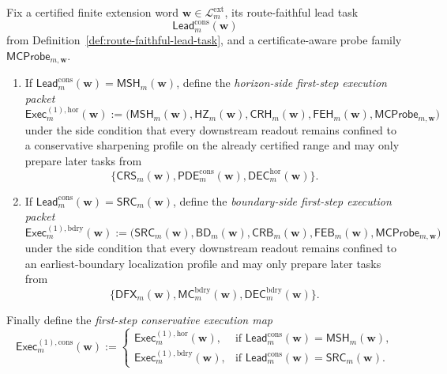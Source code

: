 \begin{definition}
\label{def:first-step-conservative-execution-packet}
Fix a certified finite extension word \(\mathbf w\in\mathcal L^{\mathrm{ext}}_{m}\), its route-faithful lead task
\[
  \mathsf{Lead}^{\mathrm{cons}}_{m}(\mathbf w)
\]
from Definition~\ref{def:route-faithful-lead-task}, and a certificate-aware probe family \(\mathsf{MCProbe}_{m,\mathbf w}\).
\begin{enumerate}[label=(\roman*)]
  \item If \(\mathsf{Lead}^{\mathrm{cons}}_{m}(\mathbf w)=\mathsf{MSH}_{m}(\mathbf w)\), define the \emph{horizon-side first-step execution packet}
  \[
    \mathsf{Exec}^{(1),\mathrm{hor}}_{m}(\mathbf w)
    :=
    \bigl(\mathsf{MSH}_{m}(\mathbf w),\mathsf{HZ}_{m}(\mathbf w),\mathsf{CRH}_{m}(\mathbf w),\mathsf{FEH}_{m}(\mathbf w),\mathsf{MCProbe}_{m,\mathbf w}\bigr)
  \]
  under the side condition that every downstream readout remains confined to a conservative sharpening profile on the already certified range and may only prepare later tasks from
  \[
    \{\mathsf{CRS}_{m}(\mathbf w),\mathsf{PDE}^{\mathrm{cons}}_{m}(\mathbf w),\mathsf{DEC}^{\mathrm{hor}}_{m}(\mathbf w)\}.
  \]
  \item If \(\mathsf{Lead}^{\mathrm{cons}}_{m}(\mathbf w)=\mathsf{SRC}_{m}(\mathbf w)\), define the \emph{boundary-side first-step execution packet}
  \[
    \mathsf{Exec}^{(1),\mathrm{bdry}}_{m}(\mathbf w)
    :=
    \bigl(\mathsf{SRC}_{m}(\mathbf w),\mathsf{BD}_{m}(\mathbf w),\mathsf{CRB}_{m}(\mathbf w),\mathsf{FEB}_{m}(\mathbf w),\mathsf{MCProbe}_{m,\mathbf w}\bigr)
  \]
  under the side condition that every downstream readout remains confined to an earliest-boundary localization profile and may only prepare later tasks from
  \[
    \{\mathsf{DFX}_{m}(\mathbf w),\mathsf{MC}^{\mathrm{bdry}}_{m}(\mathbf w),\mathsf{DEC}^{\mathrm{bdry}}_{m}(\mathbf w)\}.
  \]
\end{enumerate}
Finally define the \emph{first-step conservative execution map}
\[
  \mathsf{Exec}^{(1),\mathrm{cons}}_{m}(\mathbf w)
  :=
  \begin{cases}
    \mathsf{Exec}^{(1),\mathrm{hor}}_{m}(\mathbf w), & \text{if }\mathsf{Lead}^{\mathrm{cons}}_{m}(\mathbf w)=\mathsf{MSH}_{m}(\mathbf w),\\[2mm]
    \mathsf{Exec}^{(1),\mathrm{bdry}}_{m}(\mathbf w), & \text{if }\mathsf{Lead}^{\mathrm{cons}}_{m}(\mathbf w)=\mathsf{SRC}_{m}(\mathbf w).
  \end{cases}
\]
\end{definition}

